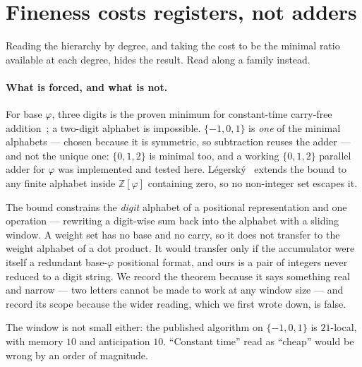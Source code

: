 \section{Fineness costs registers, not adders}\label{sec:oneadder}



Reading the hierarchy by degree, and taking the cost to be the minimal ratio
available at each degree, hides the result. Read along a family instead.

\paragraph{What is forced, and what is not.} For base $\varphi$, three digits is
the proven minimum for constant-time carry-free addition~\cite{frougny2011,
frougny2013}; a two-digit alphabet is impossible. $\{-1,0,1\}$ is \emph{one} of
the minimal alphabets --- chosen because it is symmetric, so subtraction reuses
the adder --- and not the unique one: $\{0,1,2\}$ is minimal too, and a working
$\{0,1,2\}$ parallel adder for $\varphi$ was implemented and tested here.
L\'egersk\'y~\cite{legersky2018} extends the bound to any finite alphabet inside
$\mathbb{Z}[\varphi]$ containing zero, so no non-integer set escapes it.

The bound constrains the \emph{digit} alphabet of a positional representation
and one operation --- rewriting a digit-wise sum back into the alphabet with a
sliding window. A weight set has no base and no carry, so it does not transfer
to the weight alphabet of a dot product. It would transfer only if the
accumulator were itself a redundant base-$\varphi$ positional format, and ours
is a pair of integers never reduced to a digit string. We record the theorem
because it says something real and narrow --- two letters cannot be made to work
at any window size --- and record its scope because the wider reading, which we
first wrote down, is false.

The window is not small either: the published algorithm on $\{-1,0,1\}$ is
$21$-local, with memory $10$ and anticipation $10$. ``Constant time'' read as
``cheap'' would be wrong by an order of magnitude.

